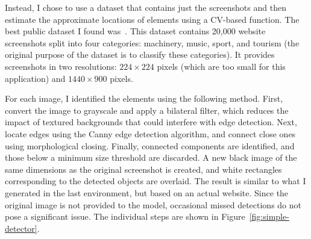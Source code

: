 \documentclass[
  digital,     %
  oneside,     %
  nosansbold,  %
  nocolorbold, %
  lof,         %
  lot,         %
]{fithesis4}
\begin{document}
Instead, I chose to use a dataset that contains just the screenshots and then estimate the approximate locations of elements using a CV-based function. The best public dataset I found was~\cite{aydos2020}. This dataset contains 20,000 website screenshots split into four categories: machinery, music, sport, and tourism (the original purpose of the dataset is to classify these categories). It provides screenshots in two resolutions: $224\times224$ pixels (which are too small for this application) and $1440\times900$ pixels.

For each image, I identified the elements using the following method. First, convert the image to grayscale and apply a bilateral filter, which reduces the impact of textured backgrounds that could interfere with edge detection. Next, locate edges using the Canny edge detection algorithm, and connect close ones using morphological closing. Finally, connected components are identified, and those below a minimum size threshold are discarded. A new black image of the same dimensions as the original screenshot is created, and white rectangles corresponding to the detected objects are overlaid. The result is similar to what I generated in the last environment, but based on an actual website. Since the original image is not provided to the model, occasional missed detections do not pose a significant issue. The individual steps are shown in Figure~\ref{fig:simple-detector}.
\end{document}
